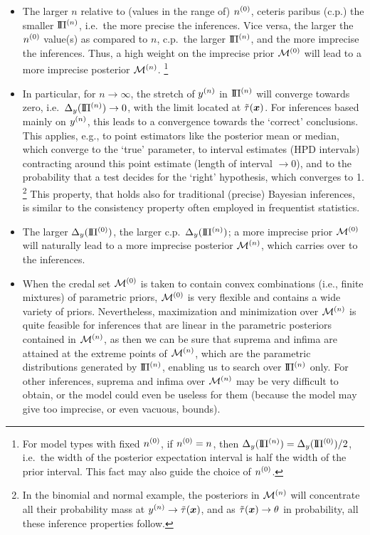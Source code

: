 \begin{itemize}
\item The larger $n$ relative to (values in the range of) $n^{(0)}$,
ceteris paribus (c.p.) the smaller $\text{I}\!\Pi^{(n)}$, i.e.\ the more precise the inferences.
Vice versa, the larger the $n^{(0)}$ value(s) as compared to $n$, c.p.\ the larger $\text{I}\!\Pi^{(n)}$, and the more imprecise the inferences.
Thus, a high weight on the imprecise prior $\mathcal{M}^{(0)}$ will lead to a more imprecise posterior $\mathcal{M}^{(n)}$.%
\footnote{For model types with fixed $n^{(0)}$, if $n^{(0)} = n$, then $\Delta_y(\text{I}\!\Pi^{(n)}) = \Delta_y(\text{I}\!\Pi^{(0)}) / 2$,
i.e.\ the width of the posterior expectation interval is half the width of the prior interval.
This fact may also guide the choice of $n^{(0)}$.}
\item In particular, for $n \to \infty$, the stretch of $y^{(n)}$ in $\text{I}\!\Pi^{(n)}$ will converge towards zero,
i.e.\ $\Delta_y(\text{I}\!\Pi^{(n)}) \to 0$, with the limit located at $\tilde{\tau}({\bm x})$.
For inferences based mainly on $y^{(n)}$, this leads to a convergence towards the `correct' conclusions.
This applies, e.g., to point estimators like the posterior mean or median, which converge to the `true' parameter,
to interval estimates (HPD intervals) contracting around this point estimate (length of interval $\to 0$),
and to the probability that a test decides for the `right' hypothesis, which converges to 1.%
\footnote{In the binomial and normal example,
the posteriors in $\mathcal{M}^{(n)}$ will concentrate all their probability mass at $y^{(n)} \to \tilde{\tau}({\bm x})$,
and as $\tilde{\tau}({\bm x}) \to \theta$ in probability, all these inference properties follow.}
This property, that holds also for traditional (precise) Bayesian inferences,
is similar to the consistency property often employed in frequentist statistics.
\item The larger $\Delta_y(\text{I}\!\Pi^{(0)})$, the larger c.p.\ $\Delta_y(\text{I}\!\Pi^{(n)})$;
a more imprecise prior $\mathcal{M}^{(0)}$ will naturally lead to a more imprecise posterior $\mathcal{M}^{(n)}$, which carries over to the inferences.
\item When the credal set $\mathcal{M}^{(0)}$ is taken to contain convex combinations (i.e., finite mixtures) of parametric priors,
$\mathcal{M}^{(0)}$ is very flexible and contains a wide variety of priors.
Nevertheless, maximization and minimization over $\mathcal{M}^{(n)}$
is quite feasible for inferences that are linear in the parametric posteriors contained in $\mathcal{M}^{(n)}$,
as then we can be sure that suprema and infima are attained at the extreme points of $\mathcal{M}^{(n)}$,
which are the parametric distributions generated by $\text{I}\!\Pi^{(n)}$, enabling us to search over $\text{I}\!\Pi^{(n)}$ only.
For other inferences, suprema and infima over $\mathcal{M}^{(n)}$ may be very difficult to obtain,
or the model could even be useless for them (because the model may give too imprecise, or even vacuous, bounds).
\end{itemize}

